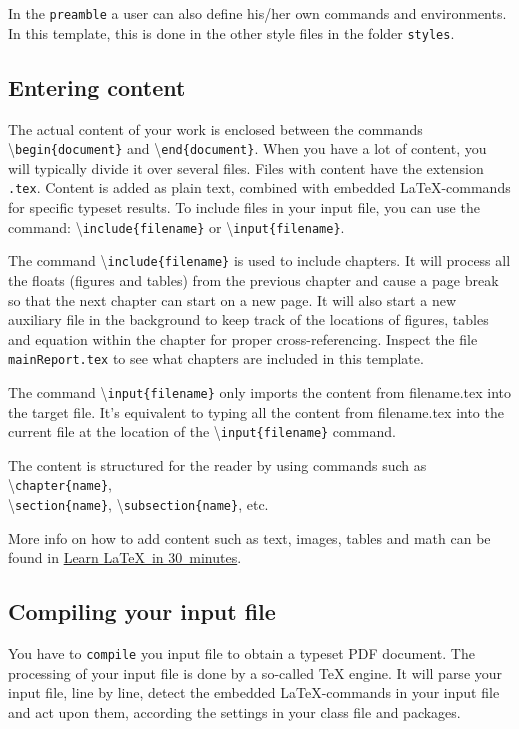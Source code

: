 In the \texttt{preamble} a user can also define his/her own commands and environments. In this template, this is done in the other style files in the folder \texttt{styles}.

\subsection{Entering content}
The actual content of your work is enclosed between the commands \textbackslash\verb|begin{document}| and \textbackslash\verb|end{document}|. When you have a lot of content, you will typically divide it over several files. Files with content have the extension \texttt{.tex}. Content is added as plain text, combined with embedded \LaTeX-commands for specific typeset results. To include files in your input file, you can use the command: \textbackslash\verb|include{filename}| or \textbackslash\verb|input{filename}|.

The command \textbackslash\verb|include{filename}| is used to include chapters. It will process all the floats (figures and tables) from the previous chapter and cause a page break so that the next chapter can start on a new page. It will also start a new auxiliary file in the background to keep track of the locations of figures, tables and equation within the chapter for proper cross-referencing. Inspect the file \texttt{mainReport.tex} to see what chapters are included in this template. 

The command \textbackslash\verb|input{filename}| only imports the content from filename.tex into the target file. It's equivalent to typing all the content from filename.tex into the current file at the location of the \textbackslash\verb|input{filename}| command.

The content is structured for the reader by using commands such as \textbackslash\verb|chapter{name}|,\\ \textbackslash\verb|section{name}|, \textbackslash\verb|subsection{name}|, etc.

More info on how to add content such as text, images, tables and math can be found in \href{https://www.overleaf.com/learn/latex/Learn_LaTeX_in_30_minutes}{Learn \LaTeX\ in 30~minutes}.

\subsection{Compiling your input file}
You have to \texttt{compile} you input file to obtain a typeset PDF document. The processing of your input file is done by a so-called TeX engine. It will parse your input file, line by line, detect the embedded \LaTeX-commands in your input file and act upon them, according the settings  in your class file and packages.

